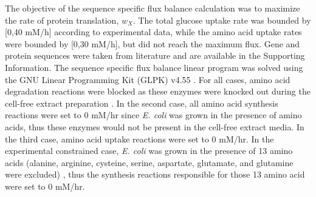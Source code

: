 \documentclass[journal=asbcd6,manuscript=article]{achemso}
\begin{document}


The objective of the sequence specific flux balance calculation was to maximize the rate of protein translation, $w_{X}$.
The total glucose uptake rate was bounded by [0,40 mM/h] according to experimental data, while the amino acid uptake rates were bounded by [0,30 mM/h], but did not reach the maximum flux.
Gene and protein sequences were taken from literature and are available in the Supporting Information.
The sequence specific flux balance linear program was solved using the GNU Linear Programming Kit (GLPK) v4.55 \cite{GLPK}.
For all cases, amino acid degradation reactions were blocked as these enzymes were knocked out during the cell-free extract preparation \cite{2005_calhoun_BiotechnologyProgress, Garamella:2016aa}.
In the second case, all amino acid synthesis reactions were set to 0 mM/hr since \textit{E. coli} was grown in the presence of amino acids, thus these enzymes would not be present in the cell-free extract media.
In the third case, amino acid uptake reactions were set to 0 mM/hr.
In the experimental constrained case, \textit{E. coli} was grown in the presence of 13 amino acids (alanine, arginine, cysteine, serine, aspartate, glutamate, and glutamine were excluded) \cite{Zawada:2003}, thus the synthesis reactions responsible for those 13 amino acid were set to 0 mM/hr.
\end{document}
